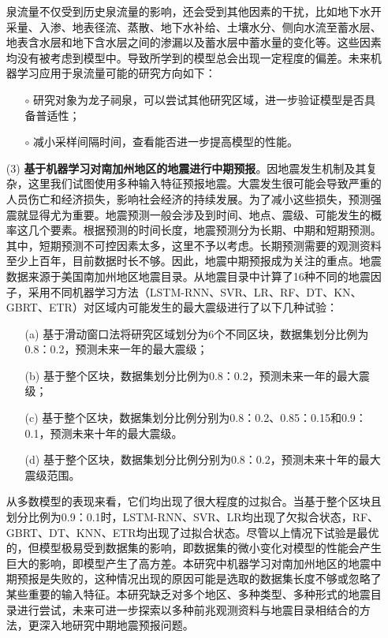 \begin{enumerate}
  泉流量不仅受到历史泉流量的影响，还会受到其他因素的干扰，比如地下水开采量、入渗、地表径流、蒸散、地下水补给、土壤水分、侧向水流至蓄水层、地表含水层和地下含水层之间的渗漏以及蓄水层中蓄水量的变化等。这些因素均没有被考虑到模型中。导致所学到的模型总会出现一定程度的偏差。未来机器学习应用于泉流量可能的研究方向如下：
  \begin{itemize}
    \item[$\circ$] 研究对象为龙子祠泉，可以尝试其他研究区域，进一步验证模型是否具备普适性；
    \item[$\circ$] 减小采样间隔时间，查看能否进一步提高模型的性能。
  \end{itemize}

  \item[(3)] \textbf{基于机器学习对南加州地区的地震进行中期预报}。因地震发生机制及其复杂，这里我们试图使用多种输入特征预报地震。大震发生很可能会导致严重的人员伤亡和经济损失，影响社会经济的持续发展。为了减小这些损失，预测强震就显得尤为重要。地震预测一般会涉及到时间、地点、震级、可能发生的概率这几个要素。根据预测的时间长度，地震预测分为长期、中期和短期预测。其中，短期预测不可控因素太多，这里不予以考虑。长期预测需要的观测资料至少上百年，目前数据时长不够。因此，地震中期预报成为关注的重点。地震数据来源于美国南加州地区地震目录。从地震目录中计算了16种不同的地震因子，采用不同机器学习方法（LSTM-RNN、SVR、LR、RF、DT、KN、GBRT、ETR）对区域内可能发生的最大震级进行了以下几种试验：
  \begin{itemize}
    \item[(a)] 基于滑动窗口法将研究区域划分为6个不同区块，数据集划分比例为0.8：0.2，预测未来一年的最大震级；
    \item[(b)] 基于整个区块，数据集划分比例为0.8：0.2，预测未来一年的最大震级；
    \item[(c)] 基于整个区块，数据集划分比例分别为0.8：0.2、0.85：0.15和0.9：0.1，预测未来十年的最大震级。
    \item[(d)] 基于整个区块，数据集划分比例分别为0.8：0.2，预测未来十年的最大震级范围。
  \end{itemize}
    
  从多数模型的表现来看，它们均出现了很大程度的过拟合。当基于整个区块且划分比例为0.9：0.1时，LSTM-RNN、SVR、LR均出现了欠拟合状态，RF、GBRT、DT、KNN、ETR均出现了过拟合状态。尽管以上情况下试验是最优的，但模型极易受到数据集的影响，即数据集的微小变化对模型的性能会产生巨大的影响，即模型产生了高方差。本研究中机器学习对南加州地区的地震中期预报是失败的，这种情况出现的原因可能是选取的数据集长度不够或忽略了某些重要的输入特征。本研究缺乏对多个地区、多种类型、多种形式的地震目录进行尝试，未来可进一步探索以多种前兆观测资料与地震目录相结合的方法，更深入地研究中期地震预报问题。

\end{enumerate}